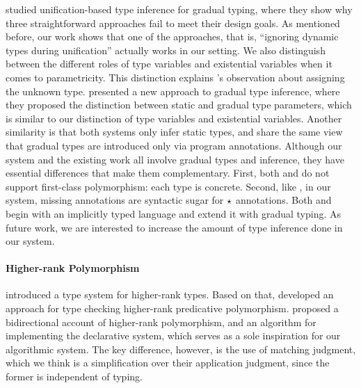 \citet{siek2008gradual} studied unification-based type inference for gradual
typing, where they show why three straightforward approaches fail to meet their
design goals. As mentioned before, our work shows that one of the approaches,
that is, ``ignoring dynamic types during unification'' actually works in our
setting. We also distinguish between the different roles of type variables and
existential variables when it comes to parametricity. This distinction explains
\citeauthor{siek2008gradual}'s observation about assigning the unknown type.
\citet{garcia2015principal} presented a new approach to gradual type inference,
where they proposed the distinction between static and gradual type parameters,
which is similar to our distinction of type variables and existential variables.
Another similarity is that both systems only infer static types, and share the
same view that gradual types are introduced only via program annotations.
Although our system and the existing work all involve gradual types and
inference, they have essential differences that make them complementary. First,
both \citet{siek2008gradual} and \citet{garcia2015principal} do not support
first-class polymorphism: each type is concrete. Second, like
\citet{siek2006gradual}, in our system, missing annotations are syntactic sugar
for $\star$ annotations. Both \citet{siek2008gradual} and
\citet{garcia2015principal} begin with an implicitly typed language and extend
it with gradual typing. As future work, we are interested to increase the amount
of type inference done in our system.


\paragraph{Higher-rank Polymorphism}

\citet{odersky1996putting} introduced a type system for higher-rank types. Based
on that, \citet{jones2007practical} developed an approach for type checking
higher-rank predicative polymorphism. \citet{dunfield2013complete} proposed a
bidirectional account of higher-rank polymorphism, and an algorithm for
implementing the declarative system, which serves as a sole inspiration for our
algorithmic system. The key difference, however, is the use of matching
judgment, which we think is a simplification over their application judgment,
since the former is independent of typing.

